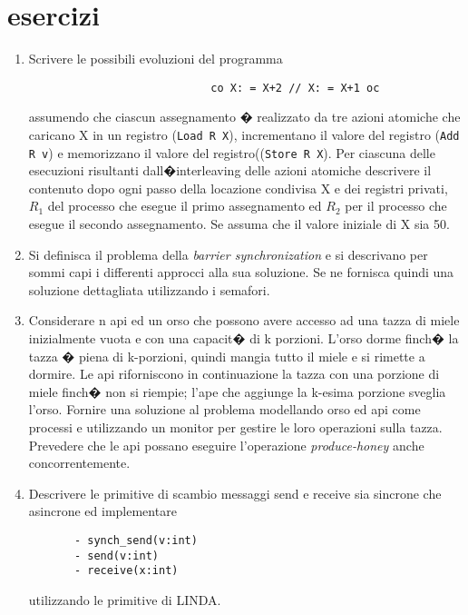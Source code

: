 \chapter{esercizi}

\begin{enumerate}
\medskip
\item 
Scrivere le possibili evoluzioni del programma 
\begin{verbatim}
                       		co X: = X+2 // X: = X+1 oc
\end{verbatim}
assumendo che ciascun assegnamento � realizzato da tre azioni atomiche che
caricano X in un registro (\verb"Load R X"), incrementano il valore del registro (\verb"Add R v") e memorizzano il valore del registro((\verb"Store R X"). Per ciascuna delle esecuzioni risultanti dall�interleaving delle azioni atomiche descrivere il contenuto dopo ogni passo della locazione condivisa X e dei registri privati,  $R_1$ del processo che esegue il primo assegnamento ed  $R_2$  per il processo che esegue il secondo assegnamento. Se assuma che il valore iniziale di X sia 50.
\medskip
\item
Si definisca il problema della \emph{barrier synchronization} e si descrivano per sommi capi i differenti approcci alla sua soluzione. Se ne fornisca quindi una soluzione dettagliata utilizzando i semafori.
\medskip
\item
Considerare n api ed un orso che possono avere accesso ad una tazza di miele
inizialmente  vuota e con una capacit� di k porzioni. L'orso dorme finch� la
tazza � piena di k-porzioni,  quindi mangia tutto il miele e si rimette a
dormire. Le api riforniscono in continuazione la  tazza con una porzione di
miele finch� non si riempie; l'ape che aggiunge la k-esima porzione sveglia
l'orso. Fornire una soluzione al problema modellando orso ed api come  processi
e utilizzando un monitor per gestire le loro operazioni sulla tazza. Prevedere che le api possano eseguire l'operazione \emph{produce-honey} anche concorrentemente.
 \medskip
 \item  Descrivere le primitive di scambio messaggi send e receive sia sincrone che asincrone ed implementare
 \vspace{-0.5cm}
 \begin{verbatim}
       - synch_send(v:int)
       - send(v:int)
       - receive(x:int)
\end{verbatim}
 \vspace{-0.3cm}
utilizzando le primitive di LINDA.

\end{enumerate}
